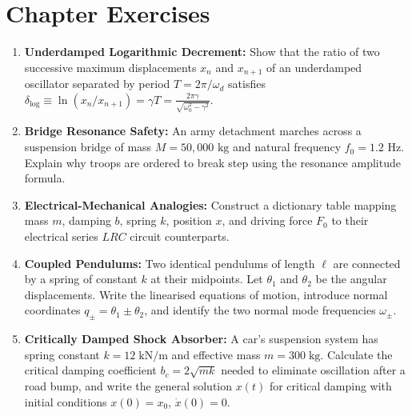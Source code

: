 \section{Chapter Exercises}
\begin{enumerate}
    \item \textbf{Underdamped Logarithmic Decrement:} Show that the ratio of two successive maximum displacements $x_n$ and $x_{n+1}$ of an underdamped oscillator separated by period $T = 2\pi/\omega_d$ satisfies $\delta_{\text{log}} \equiv \ln(x_n / x_{n+1}) = \gamma T = \frac{2\pi\gamma}{\sqrt{\omega_0^2 - \gamma^2}}$.
    \item \textbf{Bridge Resonance Safety:} An army detachment marches across a suspension bridge of mass $M = 50,000\text{ kg}$ and natural frequency $f_0 = 1.2\text{ Hz}$. Explain why troops are ordered to break step using the resonance amplitude formula.
    \item \textbf{Electrical-Mechanical Analogies:} Construct a dictionary table mapping mass $m$, damping $b$, spring $k$, position $x$, and driving force $F_0$ to their electrical series $LRC$ circuit counterparts.
    \item \textbf{Coupled Pendulums:} Two identical pendulums of length $\ell$ are connected by a spring of constant $k$ at their midpoints. Let $\theta_1$ and $\theta_2$ be the angular displacements. Write the linearised equations of motion, introduce normal coordinates $q_\pm = \theta_1 \pm \theta_2$, and identify the two normal mode frequencies $\omega_\pm$.
    \item \textbf{Critically Damped Shock Absorber:} A car's suspension system has spring constant $k = 12\;\text{kN/m}$ and effective mass $m = 300\;\text{kg}$. Calculate the critical damping coefficient $b_c = 2\sqrt{mk}$ needed to eliminate oscillation after a road bump, and write the general solution $x(t)$ for critical damping with initial conditions $x(0) = x_0$, $\dot{x}(0) = 0$.
\end{enumerate}
